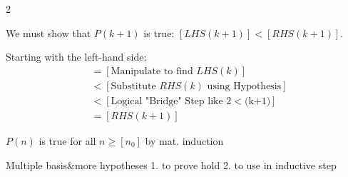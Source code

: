\documentclass[10pt]{article}
\begin{document}
\begin{multicols*}{2}
\begin{itemize}
    We must show that $P(k+1)$ is true: $[LHS(k+1)] < [RHS(k+1)]$.
    
    Starting with the left-hand side:
    \begin{align*}
        [LHS(k+1)] &= [\text{Manipulate to find } LHS(k)] \\
        &< [\text{Substitute } RHS(k) \text{ using Hypothesis}] \\
        &< [\text{Logical "Bridge" Step like 2$<$(k+1)}] \\
        &= [RHS(k+1)]
    \end{align*}
\end{itemize}
$P(n)$ is true for all $n \geq [n_0]$ by mat. induction

\textbf{} Multiple basis\&more hypotheses 1. to prove hold 2. to use in inductive step\\






\end{multicols*}
\end{document}
